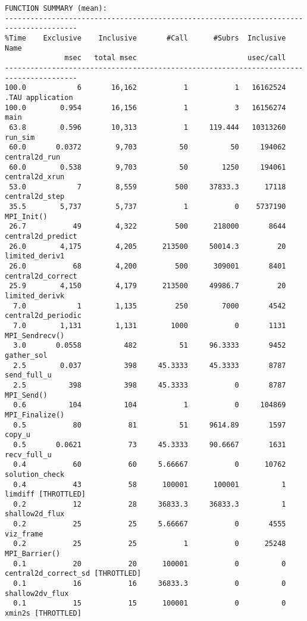 \documentclass{article}
\begin{document}
\noindent
{\footnotesize
\begin{verbatim}
FUNCTION SUMMARY (mean):
---------------------------------------------------------------------------------------
%Time    Exclusive    Inclusive       #Call      #Subrs  Inclusive Name
              msec   total msec                          usec/call 
---------------------------------------------------------------------------------------
100.0            6       16,162           1           1   16162524 .TAU application
100.0        0.954       16,156           1           3   16156274 main 
 63.8        0.596       10,313           1     119.444   10313260 run_sim 
 60.0       0.0372        9,703          50          50     194062 central2d_run 
 60.0        0.538        9,703          50        1250     194061 central2d_xrun 
 53.0            7        8,559         500     37833.3      17118 central2d_step 
 35.5        5,737        5,737           1           0    5737190 MPI_Init() 
 26.7           49        4,322         500      218000       8644 central2d_predict 
 26.0        4,175        4,205      213500     50014.3         20 limited_deriv1 
 26.0           68        4,200         500      309001       8401 central2d_correct 
 25.9        4,150        4,179      213500     49986.7         20 limited_derivk 
  7.0            1        1,135         250        7000       4542 central2d_periodic 
  7.0        1,131        1,131        1000           0       1131 MPI_Sendrecv() 
  3.0       0.0558          482          51     96.3333       9452 gather_sol 
  2.5        0.037          398     45.3333     45.3333       8787 send_full_u 
  2.5          398          398     45.3333           0       8787 MPI_Send() 
  0.6          104          104           1           0     104869 MPI_Finalize() 
  0.5           80           81          51     9614.89       1597 copy_u 
  0.5       0.0621           73     45.3333     90.6667       1631 recv_full_u 
  0.4           60           60     5.66667           0      10762 solution_check 
  0.4           43           58      100001      100001          1 limdiff [THROTTLED]
  0.2           12           28     36833.3     36833.3          1 shallow2d_flux 
  0.2           25           25     5.66667           0       4555 viz_frame 
  0.2           25           25           1           0      25248 MPI_Barrier() 
  0.1           20           20      100001           0          0 central2d_correct_sd [THROTTLED]
  0.1           16           16     36833.3           0          0 shallow2dv_flux 
  0.1           15           15      100001           0          0 xmin2s [THROTTLED]

\end{verbatim}}
\end{document}
